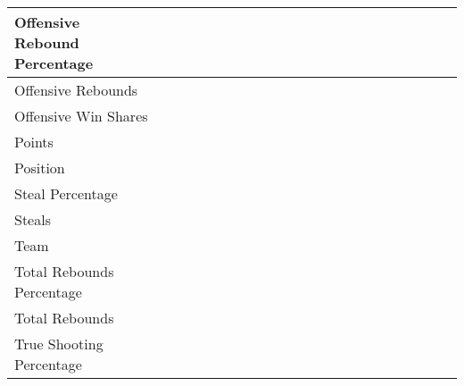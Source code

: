 \documentclass{article}
\def \cm{\checkmark}
\begin{document}
\begin{table}[ht]
\begin{tabular}{lccccccccccccccccccccc}
            \midrule
            Offensive Rebound Percentage        &     &     &     &     &     &     &     &     &     &     &     &     &     & \cm & \cm & \cm & \cm & \cm & \cm & \cm & \cm \\
            \midrule
            Offensive Rebounds                  &     &     &     &     &     &     &     &     &     &     &     &     & \cm & \cm & \cm & \cm & \cm & \cm & \cm & \cm & \cm \\
            \midrule
            Offensive Win Shares                &     &     & \cm & \cm & \cm & \cm & \cm & \cm & \cm & \cm & \cm & \cm & \cm & \cm & \cm & \cm & \cm & \cm & \cm & \cm & \cm \\
            \midrule
            Points                              & \cm & \cm & \cm & \cm & \cm & \cm & \cm & \cm & \cm & \cm & \cm & \cm & \cm & \cm & \cm & \cm & \cm & \cm & \cm & \cm & \cm \\
            \midrule
            Position                            & \cm & \cm & \cm & \cm & \cm & \cm & \cm & \cm & \cm & \cm & \cm & \cm & \cm & \cm & \cm & \cm & \cm & \cm & \cm & \cm & \cm \\
            \midrule
            Steal Percentage                    &     &     &     &     &     &     &     &     &     &     &     &     &     & \cm & \cm & \cm & \cm & \cm & \cm & \cm & \cm \\
            \midrule
            Steals                              &     &     &     &     &     &     &     &     &     &     &     &     & \cm & \cm & \cm & \cm & \cm & \cm & \cm & \cm & \cm \\
            \midrule
            Team                                & \cm & \cm & \cm & \cm & \cm & \cm & \cm & \cm & \cm & \cm & \cm & \cm & \cm & \cm & \cm & \cm & \cm & \cm & \cm & \cm & \cm \\
            \midrule
            Total Rebounds Percentage           &     &     &     &     &     &     &     &     &     &     &     & \cm & \cm & \cm & \cm & \cm & \cm & \cm & \cm & \cm & \cm \\
            \midrule
            Total Rebounds                      &     &     &     &     &     &     & \cm & \cm & \cm & \cm & \cm & \cm & \cm & \cm & \cm & \cm & \cm & \cm & \cm & \cm & \cm \\
            \midrule
            True Shooting Percentage            &     &     &     & \cm & \cm & \cm & \cm & \cm & \cm & \cm & \cm & \cm & \cm & \cm & \cm & \cm & \cm & \cm & \cm & \cm & \cm \\

\end{tabular}
\end{table}
\end{document}
